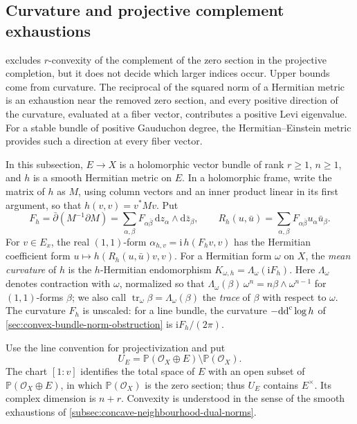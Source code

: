 \subsection{Curvature and projective complement exhaustions}
\label{subsec:projective-complement-curvature-index}

 excludes $r$-convexity of the complement of the zero section in the projective completion, but it does not decide which larger indices occur. Upper bounds come from curvature. The reciprocal of the squared norm of a Hermitian metric is an exhaustion near the removed zero section, and every positive direction of the curvature, evaluated at a fiber vector, contributes a positive Levi eigenvalue. For a stable bundle of positive Gauduchon degree, the Hermitian--Einstein metric provides such a direction at every fiber vector.

In this subsection, $E\to X$ is a holomorphic vector bundle of rank $r\geq1$, $n\geq1$, and $h$ is a smooth Hermitian metric on $E$. In a holomorphic frame, write the matrix of $h$ as $M$, using column vectors and an inner product linear in its first argument, so that $h(v,v)=v^*Mv$. Put
\[
 F_h=\bar\partial(M^{-1}\partial M)
     =\sum_{\alpha,\beta}F_{\alpha\bar\beta}\,\mathrm dz_\alpha\wedge\mathrm d\bar z_\beta,
 \qquad R_h(u,\bar u)=\sum_{\alpha,\beta}F_{\alpha\bar\beta}u_\alpha\bar u_\beta.
\]
For $v\in E_x$, the real $(1,1)$-form $\alpha_{h,v}=\mathrm i\,h(F_hv,v)$ has the Hermitian coefficient form $u\mapsto h(R_h(u,\bar u)v,v)$. For a Hermitian form $\omega$ on $X$, the \emph{mean curvature} of $h$ is the $h$-Hermitian endomorphism $K_{\omega,h}=\Lambda_\omega(\mathrm iF_h)$. Here $\Lambda_\omega$ denotes contraction with $\omega$, normalized so that $\Lambda_\omega(\beta)\,\omega^n=n\beta\wedge\omega^{n-1}$ for $(1,1)$-forms $\beta$; we also call $\operatorname{tr}_\omega\beta=\Lambda_\omega(\beta)$ the \emph{trace} of $\beta$ with respect to $\omega$. The curvature $F_h$ is unscaled: for a line bundle, the curvature $-\mathrm{dd}^{\mathrm{c}}\log h$ of \cref{sec:convex-bundle-norm-obstruction} is $\mathrm iF_h/(2\pi)$.

Use the line convention for projectivization and put
\[
 U_E=\mathbb P(\mathcal O_X\oplus E)\setminus\mathbb P(\mathcal O_X).
\]
The chart $[1:v]$ identifies the total space of $E$ with an open subset of $\mathbb P(\mathcal O_X\oplus E)$, in which $\mathbb P(\mathcal O_X)$ is the zero section; thus $U_E$ contains $E^\times$. Its complex dimension is $n+r$. Convexity is understood in the sense of the smooth exhaustions of \cref{subsec:concave-neighbourhood-dual-norms}.

